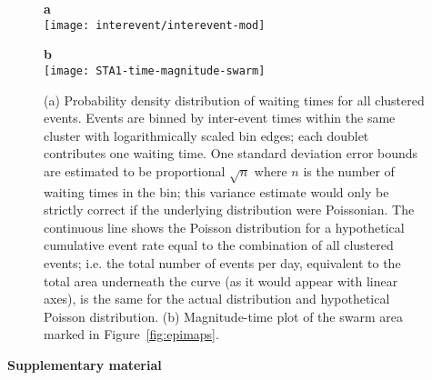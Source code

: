 \documentclass[reviewcopy]{elsart}
\renewcommand{\includegraphics}[2][]{\fbox{#2}}
\begin{document}
\begin{figure}
\centering 

\parbox{0.65\textwidth}{{\sf \bf a}  \\
\texttt{[image: interevent/interevent-mod]}}

\parbox{0.65\textwidth}{{\sf \bf b}  \\
\texttt{[image: STA1-time-magnitude-swarm]}}



\caption{(a) Probability density distribution of waiting  times for all clustered events.  Events are binned by
inter-event times within the same cluster with logarithmically scaled
bin edges; each doublet
contributes one waiting time. One standard deviation error bounds are
estimated to be proportional $\sqrt{n}$ where $n$ is the number of
waiting times in the bin; this variance estimate would only be strictly
correct if the underlying distribution were Poissonian.  The continuous
line shows the Poisson distribution for a hypothetical cumulative
event rate equal to the combination of all clustered events; i.e. the
total number of events per day, equivalent to the total area underneath the
curve (as it would appear with linear axes), is the same for the
actual distribution and hypothetical Poisson distribution. (b)
Magnitude-time plot of the swarm area marked in
Figure~\ref{fig:epimaps}.}
\label{fig:clust-statistics}
\end{figure}


\clearpage

{\bf Supplementary material}

\appendix
\setcounter{figure}{0}
\setcounter{table}{0}
\renewcommand{\thefigure}{S\arabic{figure}}
\renewcommand{\thetable}{S\arabic{table}}


\end{document}
